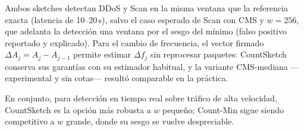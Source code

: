 \documentclass[10pt,a4paper]{article}
\begin{document}
Ambos sketches detectan DDoS y Scan en la misma ventana que la referencia exacta (latencia de 10--20\,s), salvo el caso esperado de Scan con CMS y $w=256$, que adelanta la detección una ventana por el sesgo del mínimo (falso positivo reportado y explicado). Para el cambio de frecuencia, el vector firmado $\Delta A_j = A_j - A_{j-1}$ permite estimar $\Delta f_j$ sin reprocesar paquetes: CountSketch conserva sus garantías con su estimador habitual, y la variante CMS-mediana —experimental y sin cotas— resultó comparable en la práctica.

En conjunto, para detección en tiempo real sobre tráfico de alta velocidad, CountSketch es la opción más robusta a $w$ pequeño; Count-Min sigue siendo competitivo a $w$ grande, donde su sesgo se vuelve despreciable.
\end{document}
